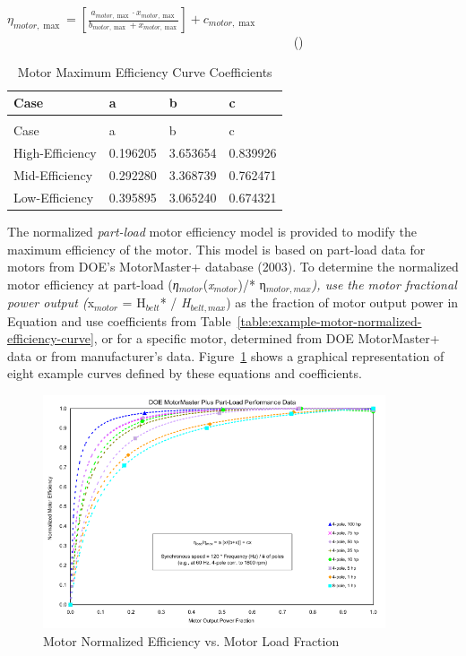 \({\eta_{motor,\max }} = \left[ {\frac{{{a_{motor,\max }} \cdot {x_{motor,\max }}}}{{{b_{motor,\max }} + {x_{motor,\max }}}}} \right] + {c_{motor,\max }}\) ~~~~~~~~~~~~~~~~~~~~~~~~~~~~~~~~~~~~~~~~~~~~~ ()

\begin{longtable}[c]{@{}llll@{}}
\caption{Motor Maximum Efficiency Curve Coefficients \label{table:motor-maximum-efficiency-curve-coefficients}} \tabularnewline
\toprule 
Case & a & b & c \tabularnewline
\midrule
\endfirsthead

\caption[]{Motor Maximum Efficiency Curve Coefficients} \tabularnewline
\toprule 
Case & a & b & c \tabularnewline
\midrule
\endhead

High-Efficiency & 0.196205 & 3.653654 & 0.839926 \tabularnewline
Mid-Efficiency & 0.292280 & 3.368739 & 0.762471 \tabularnewline
Low-Efficiency & 0.395895 & 3.065240 & 0.674321 \tabularnewline
\bottomrule
\end{longtable}

The normalized \emph{part-load} motor efficiency model is provided to modify the maximum efficiency of the motor. This model is based on part-load data for motors from DOE's MotorMaster+ database (2003). To determine the normalized motor efficiency at part-load (\emph{η\(_{motor}\)}(\emph{x\(_{motor}\)})/* η\(_{motor,max}\)\emph{), use the motor fractional power output (}x\(_{motor}\) = H\(_{belt}\)* / \emph{H\(_{belt,max}\)}) as the fraction of motor output power in Equation and use coefficients from Table~\ref{table:example-motor-normalized-efficiency-curve}, or for a specific motor, determined from DOE MotorMaster+ data or from manufacturer's data. Figure~\ref{fig:motor-normalized-efficiency-vs.-motor-load} shows a graphical representation of eight example curves defined by these equations and coefficients.

\begin{figure}[hbtp] %
\centering
\includegraphics[width=0.9\textwidth, height=0.9\textheight, keepaspectratio=true]{media/image4919.svg.png}
\caption{Motor Normalized Efficiency vs. Motor Load Fraction \protect \label{fig:motor-normalized-efficiency-vs.-motor-load}}
\end{figure}


